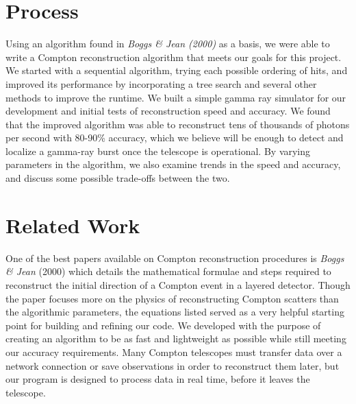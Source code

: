 \section{Process}
Using an algorithm found in \emph{Boggs \& Jean (2000)}\cite{Boggs} as a basis, we were able to write a Compton reconstruction algorithm that meets our goals for this project. We started with a sequential algorithm, trying each possible ordering of hits, and improved its performance by incorporating a tree search and several other methods to improve the runtime. We built a simple gamma ray simulator for our development and initial tests of reconstruction speed and accuracy. We found that the improved algorithm was able to reconstruct tens of thousands of photons per second with 80-90\% accuracy, which we believe will be enough to detect and localize a gamma-ray burst once the telescope is operational. By varying parameters in the algorithm, we also examine trends in the speed and accuracy, and discuss some possible trade-offs between the two.

\section{Related Work}
One of the best papers available on Compton reconstruction procedures is \emph{Boggs \& Jean} (2000)\cite{Boggs} which details the mathematical formulae and steps required to reconstruct the initial direction of a Compton event in a layered detector. Though the paper focuses more on the physics of reconstructing Compton scatters than the algorithmic parameters, the equations listed served as a very helpful starting point for building and refining our code. We developed with the purpose of creating an algorithm to be as fast and lightweight as possible while still meeting our accuracy requirements. Many Compton telescopes must transfer data over a network connection or save observations in order to reconstruct them later, but our program is designed to process data in real time, before it leaves the telescope.

